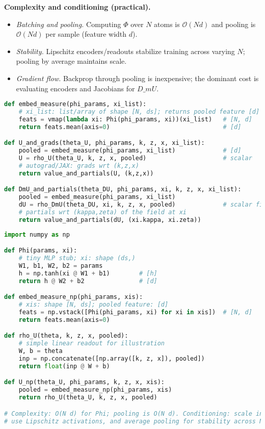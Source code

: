 ﻿\documentclass[11pt,letterpaper,oneside]{article}
\numberwithin{equation}{section}
\newcommand{\1}{\mathbf{1}}
\newcommand{\dmU}{D\_m U}
\begin{document}
\begin{tcolorbox}[mathstyle]
\textbf{Complexity and conditioning (practical).}
\begin{itemize}[leftmargin=1.15em,itemsep=0.25em]
  \item \emph{Batching and pooling.} Computing $\Phi$ over $N$ atoms is $\mathcal O(N d)$ and pooling is $\mathcal O(N d)$ per sample (feature width $d$).
  \item \emph{Stability.} Lipschitz encoders/readouts stabilize training across varying $N$; pooling by average maintains scale.
  \item \emph{Gradient flow.} Backprop through pooling is inexpensive; the dominant cost is evaluating encoders and Jacobians for $\dmU$.
\end{itemize}
\end{tcolorbox}

\begin{lstlisting}[language=Python,caption={DeepSets-style pooling for U and D\_m U (pseudo-JAX)}]
def embed_measure(phi_params, xi_list):
    # xi_list: list/array of shape [N, ds]; returns pooled feature [d]
    feats = vmap(lambda xi: Phi(phi_params, xi))(xi_list)   # [N, d]
    return feats.mean(axis=0)                               # [d]

def U_and_grads(theta_U, phi_params, k, z, x, xi_list):
    pooled = embed_measure(phi_params, xi_list)             # [d]
    U = rho_U(theta_U, k, z, x, pooled)                     # scalar
    # autograd/JAX: grads wrt (k,z,x)
    return value_and_partials(U, (k,z,x))

def DmU_and_partials(theta_DU, phi_params, xi, k, z, x, xi_list):
    pooled = embed_measure(phi_params, xi_list)
    dU = rho_DmU(theta_DU, xi, k, z, x, pooled)             # scalar field at xi
    # partials wrt (kappa,zeta) of the field at xi
    return value_and_partials(dU, (xi.kappa, xi.zeta))
\end{lstlisting}

\begin{lstlisting}[language=Python,caption={Minimal NumPy sketch (DeepSets pooling and readout)}]
import numpy as np

def Phi(params, xi):
    # tiny MLP stub; xi: shape (ds,)
    W1, b1, W2, b2 = params
    h = np.tanh(xi @ W1 + b1)        # [h]
    return h @ W2 + b2               # [d]

def embed_measure_np(phi_params, xis):
    # xis: shape [N, ds]; pooled feature: [d]
    feats = np.vstack([Phi(phi_params, xi) for xi in xis])  # [N, d]
    return feats.mean(axis=0)

def rho_U(theta, k, z, x, pooled):
    # simple linear readout for illustration
    W, b = theta
    inp = np.concatenate([np.array([k, z, x]), pooled])
    return float(inp @ W + b)

def U_np(theta_U, phi_params, k, z, x, xis):
    pooled = embed_measure_np(phi_params, xis)
    return rho_U(theta_U, k, z, x, pooled)

# Complexity: O(N d) for Phi; pooling is O(N d). Conditioning: scale inputs,
# use Lipschitz activations, and average pooling for stability across N.
\end{lstlisting}
\end{document}
